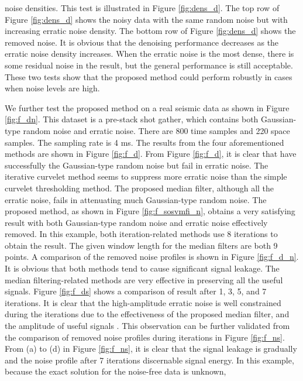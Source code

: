 noise densities. This test is illustrated in Figure \ref{fig:dens_d}. The top row of Figure \ref{fig:dens_d} shows the noisy data with the same random noise but with increasing erratic noise density. The bottom row of Figure \ref{fig:dens_d} shows the  removed noise. It is obvious that the denoising performance decreases as the erratic noise density increases. When the erratic noise is the most dense, there is some residual noise in the result, but the general performance is still acceptable. These two tests show that the proposed method could perform robustly in cases when noise levels are high. 



We further test the proposed method on a real seismic data as shown in Figure \ref{fig:f_dn}. This dataset is a  pre-stack shot gather, which contains both Gaussian-type random noise and erratic noise. There are 800 time samples and 220 space samples. The sampling rate is 4 ms. The results from the four aforementioned methods are shown in Figure \ref{fig:f_d}. From Figure \ref{fig:f_d}, it is clear that  have successfully  the Gaussian-type random noise but fail in   erratic noise. The iterative curvelet method seems to suppress more erratic noise than the simple curvelet thresholding method. The proposed median filter, although  all the erratic noise, fails in attenuating much  Gaussian-type random noise. The proposed method, as shown in Figure \ref{fig:f_sosvmfi_n}, obtains a very satisfying result with both  Gaussian-type random noise and erratic noise effectively removed. In this example, both iteration-related methods use 8 iterations to obtain the result. The given window length for the median filters are both 9 points. A comparison of the removed noise profiles is shown in Figure \ref{fig:f_d_n}. It is obvious that both  methods tend to cause significant signal leakage.  The median filtering-related methods are very effective in preserving all the useful signals.  Figure \ref{fig:f_ds} shows a comparison of  result after 1, 3, 5, and 7 iterations. It is clear that the high-amplitude erratic noise is well constrained during the iterations due to the effectiveness of the proposed median filter, and the amplitude of  useful signals . This observation can be further validated from the comparison of removed noise profiles during iterations in Figure \ref{fig:f_ns}. From (a) to (d) in Figure \ref{fig:f_ns}, it is clear that the signal leakage is gradually  and the noise profile after 7 iterations  discernable signal energy. In this example, because the exact solution for the noise-free data is unknown, 